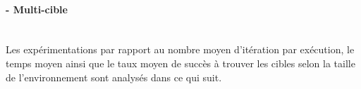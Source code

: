 

 


\paragraph{- Multi-cible}
\textbf{ }\\
Les expérimentations par rapport au nombre moyen d'itération par exécution, le temps moyen ainsi que le taux moyen de succès à trouver les cibles selon la taille de l'environnement sont analysés dans ce qui suit.

